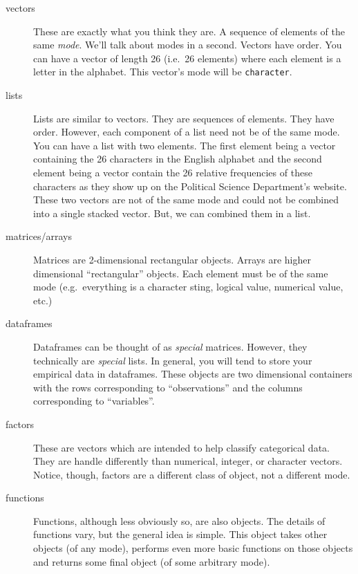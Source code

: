 \begin{description}

\item[vectors] These are exactly what you think they are. A sequence
  of elements of the same \textit{mode}. We'll talk about modes in a
  second. Vectors have order. You can have a vector of length 26
  (i.e.\ 26 elements) where each element is a letter in the
  alphabet. This vector's mode will be \texttt{character}.

\item[lists] Lists are similar to vectors. They are sequences of
  elements. They have order. However, each component of a list need
  not be of the same mode. You can have a list with two elements. The
  first element being a vector containing the 26 characters in the
  English alphabet and the second element being a vector contain the
  26 relative frequencies of these characters as they show up on the
  Political Science Department's website. These two vectors are not of
  the same mode and could not be combined into a single stacked
  vector. But, we can combined them in a list.

\item[matrices/arrays] Matrices are 2-dimensional rectangular
  objects. Arrays are higher dimensional ``rectangular'' objects. Each
  element must be of the same mode (e.g.\ everything is a character
  sting, logical value, numerical value, etc.)

\item[dataframes] Dataframes can be thought of as \textit{special}
  matrices. However, they technically are \textit{special} lists. In
  general, you will tend to store your empirical data in
  dataframes. These objects are two dimensional containers with the
  rows corresponding to ``observations'' and the columns corresponding
  to ``variables''.

\item[factors] These are vectors which are intended to help classify
  categorical data. They are handle differently than numerical,
  integer, or character vectors. Notice, though, factors are a
  different class of object, not a different mode.

\item[functions] Functions, although less obviously so, are also
  objects. The details of functions vary, but the general idea is
  simple. This object takes other objects (of any mode),
  performs even more basic functions on those objects and returns some
  final object (of some arbitrary mode).
\end{description}

